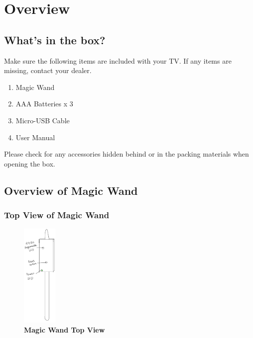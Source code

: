 %

%
%


\chapter{Overview}



\section{What's in the box?}

Make sure the following items are included with your TV. If any items are missing, contact your dealer.

\begin{enumerate}
	\item Magic Wand
	\item AAA Batteries x 3
	\item Micro-USB Cable
	\item User Manual
\end{enumerate}

Please check for any accessories hidden behind or in the packing materials when opening the box.

\bigskip

\section{Overview of Magic Wand}

\subsection{Top View of Magic Wand}

\begin{figure}[h!]
	\centering
	\includegraphics[height=5cm]{Images/MagicWandTopView.jpeg}
	\caption{\textbf{Magic Wand Top View}}
	\label{fig:Magic Wand Top View}
\end{figure}

